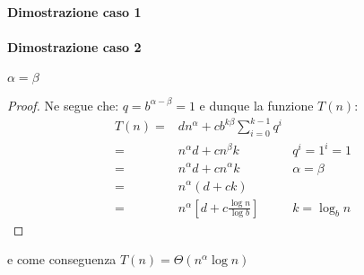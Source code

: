             \paragraph{Dimostrazione caso 1}
            \paragraph{Dimostrazione caso 2} $\alpha = \beta $
            \begin{proof}
                Ne segue che: $q=b^{\alpha-\beta}=1$ e dunque la funzione $T(n)$:
                \begin{align}
                    T(n)=&dn^\alpha+cb^{k\beta}\sum_{i=0}^{k-1}q^i\\
                    =&n^\alpha d+cn^\beta k \qquad & q^i=1^i=1\\
                    =&n^\alpha d+cn^\alpha k & \alpha = \beta\\
                    =&n^\alpha(d+ck)\\
                    =&n^\alpha\left[d+c\frac{\log n}{\log b}\right] & k=\log_b n
                \end{align}
            \end{proof}
            e come conseguenza $T(n)=\Theta(n^\alpha\log n)$